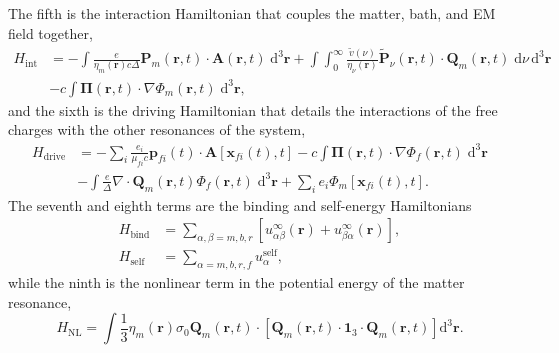\documentclass{article}
\begin{document}
The fifth is the interaction Hamiltonian that couples the matter, bath, and EM field together,
\begin{equation}
\begin{split}
H_\mathrm{int} &= -\int\frac{e}{\eta_m(\mathbf{r})c\Delta}\mathbf{P}_m(\mathbf{r},t)\cdot\mathbf{A}(\mathbf{r},t)\;\mathrm{d}^3\mathbf{r} + \int\int_0^\infty\frac{\tilde{v}(\nu)}{\eta_\nu(\mathbf{r})}\tilde{\mathbf{P}}_\nu(\mathbf{r},t)\cdot\mathbf{Q}_m(\mathbf{r},t)\;\mathrm{d}\nu\,\mathrm{d}^3\mathbf{r}\\
& - c\int\bm{\Pi}(\mathbf{r},t)\cdot\nabla\Phi_m(\mathbf{r},t)\;\mathrm{d}^3\mathbf{r},
\end{split}
\end{equation}
and the sixth is the driving Hamiltonian that details the interactions of the free charges with the other resonances of the system,
\begin{equation}
\begin{split}
H_\mathrm{drive} &= -\sum_i\frac{e_i}{\mu_{fi}c}\mathbf{p}_{fi}(t)\cdot\mathbf{A}[\mathbf{x}_{fi}(t),t] - c\int\bm{\Pi}(\mathbf{r},t)\cdot\nabla\Phi_f(\mathbf{r},t)\;\mathrm{d}^3\mathbf{r}\\&- \int\frac{e}{\Delta}\nabla\cdot\mathbf{Q}_m(\mathbf{r},t)\Phi_f(\mathbf{r},t)\;\mathrm{d}^3\mathbf{r} + \sum_ie_i\Phi_m[\mathbf{x}_{fi}(t),t].
\end{split}
\end{equation}
The seventh and eighth terms are the binding and self-energy Hamiltonians
\begin{equation}
\begin{split}
H_\mathrm{bind} &= \sum_{\alpha,\beta = m,b,r}\left[u_{\alpha\beta}^\infty(\mathbf{r}) + u_{\beta\alpha}^\infty(\mathbf{r})\right],\\
H_\mathrm{self} &= \sum_{\alpha = m,b,r,f}u_\alpha^\mathrm{self},
\end{split}
\end{equation}
while the ninth is the nonlinear term in the potential energy of the matter resonance,
\begin{equation}
H_\mathrm{NL} = \int\frac{1}{3}\eta_m(\mathbf{r})\sigma_0 \mathbf{Q}_m(\mathbf{r},t)\cdot\left[\mathbf{Q}_m(\mathbf{r},t)\cdot\bm{1}_3\cdot\mathbf{Q}_m(\mathbf{r},t)\right]\mathrm{d}^3\mathbf{r}.
\end{equation}
\end{document}
